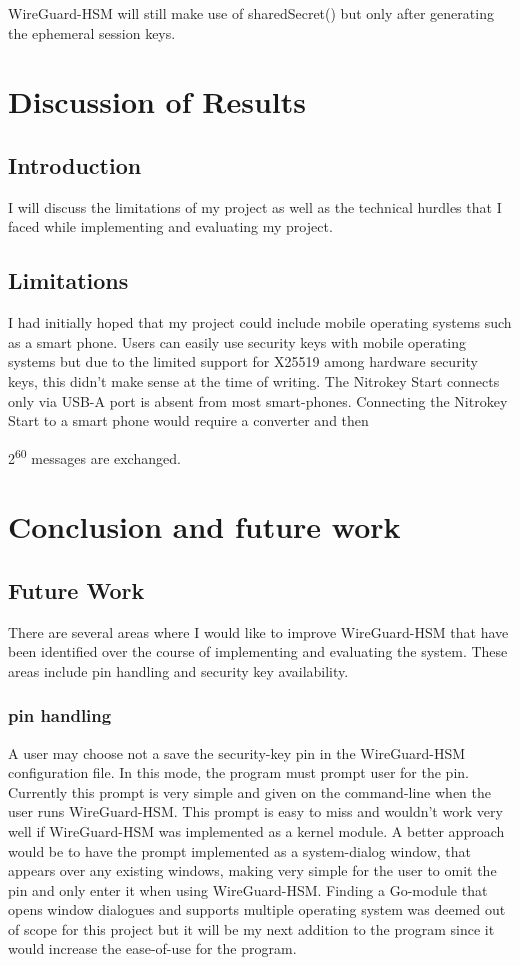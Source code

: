 \documentclass [11pt, proquest] {uwthesis}[2020/02/24]
\begin{document}
WireGuard-HSM will still make use of sharedSecret() but only after generating the ephemeral session keys. 


\chapter {Discussion of Results}
\section {Introduction}
I will discuss the limitations of my project as well as the technical hurdles that I faced while implementing and evaluating my project.

\section {Limitations}
I had initially hoped that my project could include mobile operating systems such as a smart phone. Users can easily use security keys with mobile operating systems but due to the limited support for X25519 among hardware security keys, this didn't make sense at the time of writing. The Nitrokey Start connects only via USB-A port is absent from most smart-phones. Connecting the Nitrokey Start to a smart phone would require a converter and then

2\textsuperscript{60} messages are exchanged.


\chapter {Conclusion and future work}

\section {Future Work}
There are several areas where I would like to improve WireGuard-HSM that have been identified over the course of implementing and evaluating the system. These areas include pin handling and security key availability. 

\subsection{pin handling}
 A user may choose not a save the security-key pin in the WireGuard-HSM configuration file. In this mode, the program must prompt user for the pin. Currently this prompt is very simple and given on the command-line when the user runs WireGuard-HSM. This prompt is easy to miss and wouldn't work very well if WireGuard-HSM was implemented as a kernel module. A better approach would be to have the prompt implemented as a system-dialog window, that appears over any existing windows, making very simple for the user to omit the pin and only enter it when using WireGuard-HSM. Finding a Go-module that opens window dialogues and supports multiple operating system was deemed out of scope for this project but it will be my next addition to the program since it would increase the ease-of-use for the program. 
 
\end{document}
